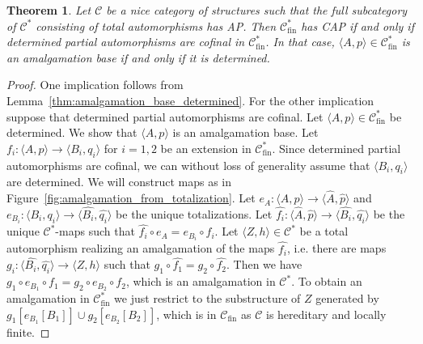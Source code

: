 \documentclass[10pt,a4paper]{article}
\newtheorem{tw}{Theorem}[section]
\theoremstyle{definition}
\theoremstyle{remark}
\newcommand \seq [1]{\langle #1 \rangle}
\newcommand \maps {\colon} %
\newcommand \im [1]{[#1]} %
\newcommand \cmp {\circ} %
\newcommand \C {\mathscr{C}}
\newcommand \fin {{\operatorname{fin}}}
\begin{document}
\begin{tw} \label{thm:amalgamation_from_totalization}
    Let $\C$ be a nice category of structures such that the full subcategory of $\C^*$ consisting of total automorphisms has AP.
    Then $\C^*_\fin$ has CAP if and only if determined partial automorphisms are cofinal in $\C^*_\fin$.
    In that case, $\seq{A, p} \in \C^*_\fin$ is an amalgamation base if and only if it is determined.
\end{tw}
\begin{proof}
    One implication follows from Lemma~\ref{thm:amalgamation_base_determined}.
    For the other implication suppose that determined partial automorphisms are cofinal.
    Let $\seq{A, p} \in \C^*_\fin$ be determined. We show that $\seq{A, p}$ is an amalgamation base. 
    Let $f_i\maps \seq{A, p} \to \seq{B_i, q_i}$ for $i = 1, 2$ be an extension in $\C^*_\fin$.
    Since determined partial automorphisms are cofinal, we can without loss of generality assume that $\seq{B_i, q_i}$ are determined.
    We will construct maps as in Figure~\ref{fig:amalgamation_from_totalization}.
    Let $e_A\maps \seq{A, p} \to \seq{\hat{A}, \hat{p}}$ and $e_{B_i}\maps \seq{B_i, q_i} \to \seq{\hat{B_i}, \hat{q_i}}$ be the unique totalizations.
    Let $\hat{f_i}\maps \seq{\hat{A}, \hat{p}} \to \seq{\hat{B_i}, \hat{q_i}}$ be the unique $\C^*$-maps such that $\hat{f_i} \cmp e_A = e_{B_i} \cmp f_i$.
    Let $\seq{Z, h} \in \C^*$ be a total automorphism realizing an amalgamation of the maps $\hat{f_i}$, i.e. there are maps $g_i\maps \seq{\hat{B_i}, \hat{q_i}} \to \seq{Z, h}$ such that $g_1 \cmp \hat{f_1} = g_2 \cmp \hat{f_2}$.
    Then we have $g_1 \cmp e_{B_1} \cmp f_1 = g_2 \cmp e_{B_2} \cmp f_2$, which is an amalgamation in $\C^*$.
    To obtain an amalgamation in $\C_\fin^*$ we just restrict to the substructure of $Z$ generated by $g_1\im{e_{B_1}\im{B_1}} \cup g_2\im{e_{B_2}\im{B_2}}$, which is in $\C_\fin$ as $\C$ is hereditary and locally finite.
\end{proof}
\end{document}
